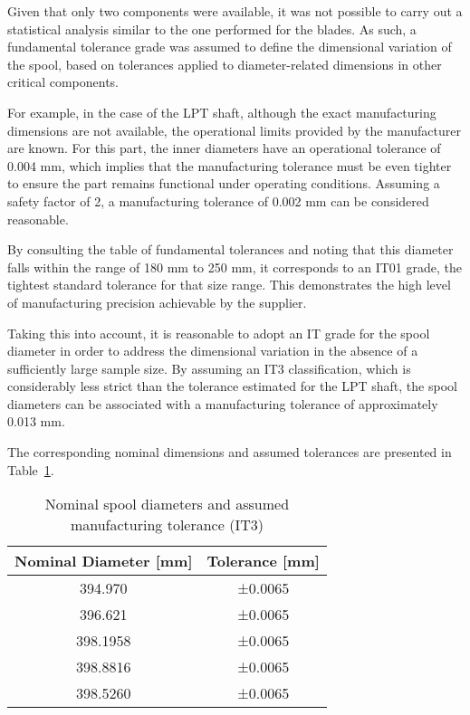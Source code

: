 Given that only two components were available, it was not possible to carry out a statistical analysis similar to the one performed for the blades. As such, a fundamental tolerance grade was assumed to define the dimensional variation of the spool, based on tolerances applied to diameter-related dimensions in other critical components.

For example, in the case of the \gls{LPT} shaft, although the exact manufacturing dimensions are not available, the operational limits provided by the manufacturer are known. For this part, the inner diameters have an operational tolerance of 0.004 mm, which implies that the manufacturing tolerance must be even tighter to ensure the part remains functional under operating conditions. Assuming a safety factor of 2, a manufacturing tolerance of 0.002 mm can be considered reasonable.

By consulting the table of fundamental tolerances and noting that this diameter falls within the range of 180 mm to 250 mm, it corresponds to an IT01 grade, the tightest standard tolerance for that size range. This demonstrates the high level of manufacturing precision achievable by the supplier.

Taking this into account, it is reasonable to adopt an IT grade for the spool diameter in order to address the dimensional variation in the absence of a sufficiently large sample size. By assuming an IT3 classification, which is considerably less strict than the tolerance estimated for the \gls{LPT} shaft, the spool diameters can be associated with a manufacturing tolerance of approximately 0.013 mm.

The corresponding nominal dimensions and assumed tolerances are presented in Table~\ref{tab:spool_nominal_tolerance}.

\begin{table}[H]
    \centering
    \caption{Nominal spool diameters and assumed manufacturing tolerance (IT3)}
    \label{tab:spool_nominal_tolerance}
    \begin{tabular}{cc}
        \hline
        \textbf{Nominal Diameter [mm]} & \textbf{Tolerance [mm]} \\
        \hline
        394.970 & ±0.0065 \\
        396.621 & ±0.0065 \\
        398.1958 & ±0.0065 \\
        398.8816 & ±0.0065 \\
        398.5260 & ±0.0065 \\
        \hline
    \end{tabular}
\end{table}